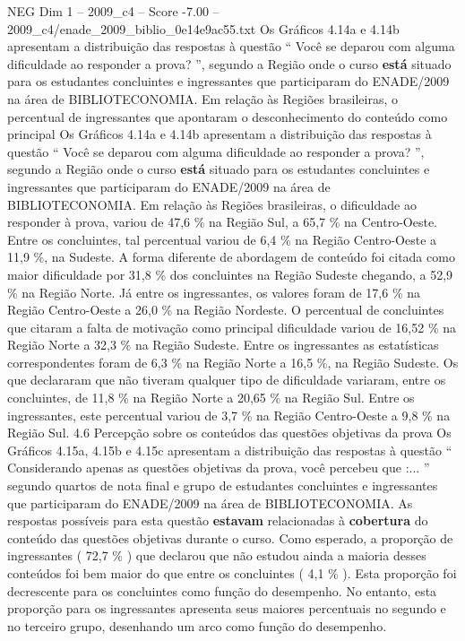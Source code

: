\begin{textsample}{NEG Dim 1 – 2009\_c4 – Score -7.00 – 2009\_c4/enade\_2009\_biblio\_0e14e9ac55.txt}
Os Gráficos 4.14a e 4.14b apresentam a distribuição das respostas à questão “ Você se deparou com alguma dificuldade ao responder a prova? ”, segundo a Região onde o curso \textbf{está} situado para os estudantes concluintes e ingressantes que participaram do ENADE/2009 na área de BIBLIOTECONOMIA.
Em relação às Regiões brasileiras, o percentual de ingressantes que apontaram o desconhecimento do conteúdo como principal Os Gráficos 4.14a e 4.14b apresentam a distribuição das respostas à questão “ Você se deparou com alguma dificuldade ao responder a prova? ”, segundo a Região onde o curso \textbf{está} situado para os estudantes concluintes e ingressantes que participaram do ENADE/2009 na área de BIBLIOTECONOMIA.
Em relação às Regiões brasileiras, o dificuldade ao responder à prova, variou de 47,6 \% na Região Sul, a 65,7 \% na Centro-Oeste.
Entre os concluintes, tal percentual variou de 6,4 \% na Região Centro-Oeste a 11,9 \%, na Sudeste.
A forma diferente de abordagem de conteúdo foi citada como maior dificuldade por 31,8 \% dos concluintes na Região Sudeste chegando, a 52,9 \% na Região Norte.
Já entre os ingressantes, os valores foram de 17,6 \% na Região Centro-Oeste a 26,0 \% na Região Nordeste.
O percentual de concluintes que citaram a falta de motivação como principal dificuldade variou de 16,52 \% na Região Norte a 32,3 \% na Região Sudeste.
Entre os ingressantes as estatísticas correspondentes foram de 6,3 \% na Região Norte a 16,5 \%, na Região Sudeste.
Os que declararam que não tiveram qualquer tipo de dificuldade variaram, entre os concluintes, de 11,8 \% na Região Norte a 20,65 \% na Região Sul.
Entre os ingressantes, este percentual variou de 3,7 \% na Região Centro-Oeste a 9,8 \% na Região Sul. 4.6 Percepção sobre os conteúdos das questões objetivas da prova Os Gráficos 4.15a, 4.15b e 4.15c apresentam a distribuição das respostas à questão “ Considerando apenas as questões objetivas da prova, você percebeu que :... ” segundo quartos de nota final e grupo de estudantes concluintes e ingressantes que participaram do ENADE/2009 na área de BIBLIOTECONOMIA.
As respostas possíveis para esta questão \textbf{estavam} relacionadas à \textbf{cobertura} do conteúdo das questões objetivas durante o curso.
Como esperado, a proporção de ingressantes ( 72,7 \% ) que declarou que não estudou ainda a maioria desses conteúdos foi bem maior do que entre os concluintes ( 4,1 \% ).
Esta proporção foi decrescente para os concluintes como função do desempenho.
No entanto, esta proporção para os ingressantes apresenta seus maiores percentuais no segundo e no terceiro grupo, desenhando um arco como função do desempenho.

\end{textsample}
